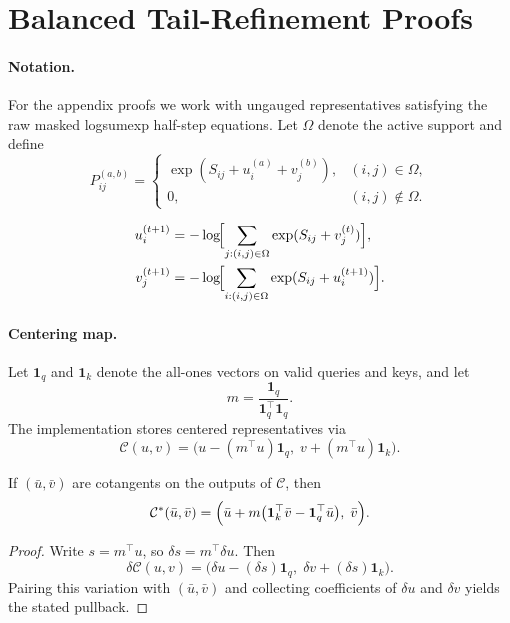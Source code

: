 \clearpage



\newpage
\appendix

\section{Balanced Tail-Refinement Proofs}
\label{app:proofs}

\paragraph{Notation.}
For the appendix proofs we work with ungauged representatives satisfying the raw masked logsumexp half-step equations. Let $\Omega$ denote the active support and define
\[
P^{(a,b)}_{ij} =
\begin{cases}
\exp(S_{ij}+u_i^{(a)}+v_j^{(b)}), & (i,j)\in\Omega, \\
0, & (i,j)\notin\Omega.
\end{cases}
\]

\begin{align}
    u_i^{(t+1)} &= -\log\!\Bigl[\sum_{j:(i,j)\in\Omega} \exp(S_{ij} + v_j^{(t)})\Bigr], \label{eq:u_update_app_unified}\\
    v_j^{(t+1)} &= -\log\!\Bigl[\sum_{i:(i,j)\in\Omega} \exp(S_{ij} + u_i^{(t+1)})\Bigr]. \label{eq:v_update_app_unified}
\end{align}

\paragraph{Centering map.}
Let $\mathbf{1}_q$ and $\mathbf{1}_k$ denote the all-ones vectors on valid queries and keys, and let
\[
m = \frac{\mathbf{1}_q}{\mathbf{1}_q^\top\mathbf{1}_q}.
\]
The implementation stores centered representatives via
\[
\mathcal{C}(u,v)=\bigl(u-(m^\top u)\mathbf{1}_q,\; v+(m^\top u)\mathbf{1}_k\bigr).
\]

\begin{lemma}
If $(\bar u,\bar v)$ are cotangents on the outputs of $\mathcal{C}$, then
\[
\mathcal{C}^*(\bar u,\bar v)
=
\Bigl(
\bar u + m\bigl(\mathbf{1}_k^\top \bar v - \mathbf{1}_q^\top \bar u\bigr),
\;
\bar v
\Bigr).
\]
\end{lemma}

\begin{proof}
Write $s=m^\top u$, so $\delta s = m^\top \delta u$. Then
\[
\delta \mathcal{C}(u,v)
=
\bigl(\delta u-(\delta s)\mathbf{1}_q,\; \delta v+(\delta s)\mathbf{1}_k\bigr).
\]
Pairing this variation with $(\bar u,\bar v)$ and collecting coefficients of $\delta u$ and $\delta v$ yields the stated pullback.
\end{proof}

